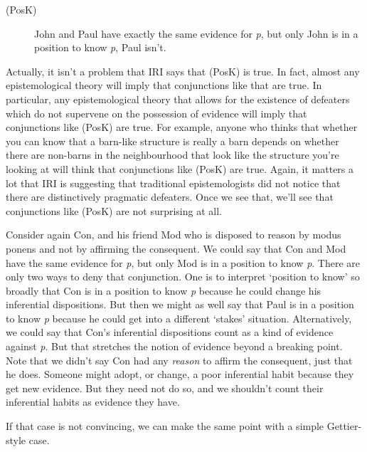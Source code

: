 \documentclass[
  11pt,
  letterpaper,
  DIV=11,
  numbers=noendperiod,
  twoside]{scrartcl}
\begin{document}
\begin{description}
\item[(PosK)]
John and Paul have exactly the same evidence for \emph{p}, but only John
is in a position to know \emph{p}, Paul isn't.
\end{description}

Actually, it isn't a problem that IRI says that (PosK) is true. In fact,
almost any epistemological theory will imply that conjunctions like that
are true. In particular, any epistemological theory that allows for the
existence of defeaters which do not supervene on the possession of
evidence will imply that conjunctions like (PosK) are true. For example,
anyone who thinks that whether you can know that a barn-like structure
is really a barn depends on whether there are non-barns in the
neighbourhood that look like the structure you're looking at will think
that conjunctions like (PosK) are true. Again, it matters a lot that IRI
is suggesting that traditional epistemologists did not notice that there
are distinctively pragmatic defeaters. Once we see that, we'll see that
conjunctions like (PosK) are not surprising at all.

Consider again Con, and his friend Mod who is disposed to reason by
modus ponens and not by affirming the consequent. We could say that Con
and Mod have the same evidence for \emph{p}, but only Mod is in a
position to know \emph{p}. There are only two ways to deny that
conjunction. One is to interpret `position to know' so broadly that Con
is in a position to know \emph{p} because he could change his
inferential dispositions. But then we might as well say that Paul is in
a position to know \emph{p} because he could get into a different
`stakes' situation. Alternatively, we could say that Con's inferential
dispositions count as a kind of evidence against \emph{p}. But that
stretches the notion of evidence beyond a breaking point. Note that we
didn't say Con had any \emph{reason} to affirm the consequent, just that
he does. Someone might adopt, or change, a poor inferential habit
because they get new evidence. But they need not do so, and we shouldn't
count their inferential habits as evidence they have.

If that case is not convincing, we can make the same point with a simple
Gettier-style case.
\end{document}
